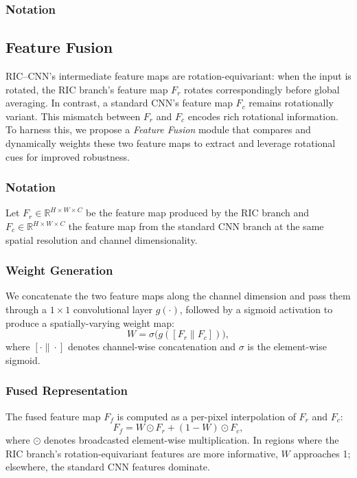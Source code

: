 \subsubsection{Notation}


\subsection{Feature Fusion}

RIC–CNN’s intermediate feature maps are rotation-equivariant: when the input is rotated, the RIC branch’s feature map $F_r$ rotates correspondingly before global averaging. In contrast, a standard CNN’s feature map $F_c$ remains rotationally variant. This mismatch between $F_r$ and $F_c$ encodes rich rotational information. To harness this, we propose a \emph{Feature Fusion} module that compares and dynamically weights these two feature maps to extract and leverage rotational cues for improved robustness.

\subsubsection{Notation}
Let $F_r\in\mathbb{R}^{H\times W\times C}$ be the feature map produced by the RIC branch and $F_c\in\mathbb{R}^{H\times W\times C}$ the feature map from the standard CNN branch at the same spatial resolution and channel dimensionality.

\subsubsection{Weight Generation}
We concatenate the two feature maps along the channel dimension and pass them through a $1\times1$ convolutional layer $g(\cdot)$, followed by a sigmoid activation to produce a spatially-varying weight map:
\[
W = \sigma\bigl(g([F_r \| F_c])\bigr),
\]
where $[\cdot\|\cdot]$ denotes channel-wise concatenation and $\sigma$ is the element-wise sigmoid.

\subsubsection{Fused Representation}
The fused feature map $F_f$ is computed as a per-pixel interpolation of $F_r$ and $F_c$:
\[
F_f = W \odot F_r + (1 - W) \odot F_c,
\]
where $\odot$ denotes broadcasted element-wise multiplication. In regions where the RIC branch’s rotation-equivariant features are more informative, $W$ approaches 1; elsewhere, the standard CNN features dominate.


